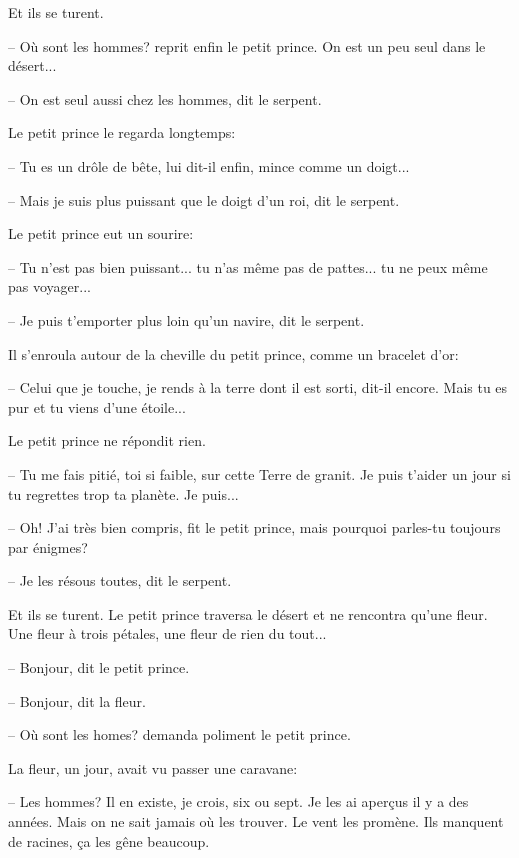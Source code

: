 \documentclass[a4paper]{report}
\begin{document}
Et ils se turent.

-- Où sont les hommes? reprit enfin le petit prince. On est un peu seul dans le désert...

-- On est seul aussi chez les hommes, dit le serpent.

Le petit prince le regarda longtemps:


-- Tu es un drôle de bête, lui dit-il enfin, mince comme un doigt...

-- Mais je suis plus puissant que le doigt d'un roi, dit le serpent.

Le petit prince eut un sourire:

-- Tu n'est pas bien puissant... tu n'as même pas de pattes... tu ne peux même pas voyager...

-- Je puis t'emporter plus loin qu'un navire, dit le serpent.

Il s'enroula autour de la cheville du petit prince, comme un bracelet d'or:

-- Celui que je touche, je rends à la terre dont il est sorti, dit-il encore. Mais tu es pur et tu viens d'une étoile...

Le petit prince ne répondit rien.

-- Tu me fais pitié, toi si faible, sur cette Terre de granit. Je puis t'aider un jour si tu regrettes trop ta planète. Je puis...

-- Oh! J'ai très bien compris, fit le petit prince, mais pourquoi parles-tu toujours par énigmes?

-- Je les résous toutes, dit le serpent.

Et ils se turent.
\parachapter{} %
Le petit prince traversa le désert et ne rencontra qu'une fleur. Une fleur à trois pétales, une fleur de rien du tout...


-- Bonjour, dit le petit prince.

-- Bonjour, dit la fleur.

-- Où sont les homes? demanda poliment le petit prince.

La fleur, un jour, avait vu passer une caravane:

-- Les hommes? Il en existe, je crois, six ou sept. Je les ai aperçus il y a des années. Mais on ne sait jamais où les trouver. Le vent les promène. Ils manquent de racines, ça les gêne beaucoup.
\end{document}
